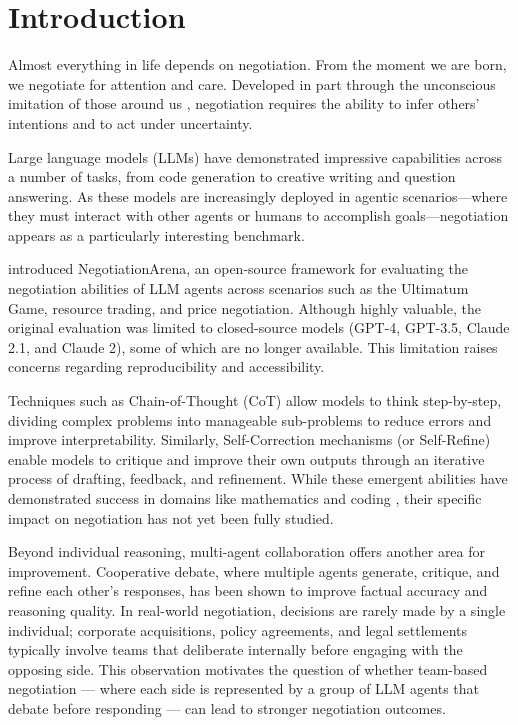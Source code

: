 \chapter{Introduction} \label{chap:intro}

Almost everything in life depends on negotiation. From the moment we are born, we negotiate for attention and care. Developed in part through the unconscious imitation of those around us \cite{Graham2014}, negotiation requires the ability to infer others’ intentions and to act under uncertainty.

Large language models (LLMs) have demonstrated impressive capabilities across a number of tasks, from code generation to creative writing and question answering. As these models are increasingly deployed in agentic scenarios—where they must interact with other agents or humans to accomplish goals—negotiation appears as a particularly interesting benchmark.

\textcite{bianchi_how_2024} introduced NegotiationArena, an open-source framework for evaluating the negotiation abilities of LLM agents across scenarios such as the Ultimatum Game, resource trading, and price negotiation. Although highly valuable, the original evaluation was limited to closed-source models (GPT-4, GPT-3.5, Claude 2.1, and Claude 2), some of which are no longer available. This limitation raises concerns regarding reproducibility and accessibility.

Techniques such as Chain-of-Thought (CoT) allow models to think step-by-step, dividing complex problems into manageable sub-problems to reduce errors and improve interpretability. Similarly, Self-Correction mechanisms (or Self-Refine) enable models to critique and improve their own outputs through an iterative process of drafting, feedback, and refinement. While these emergent abilities have demonstrated success in domains like mathematics and coding , their specific impact on negotiation has not yet been fully studied. 

Beyond individual reasoning, multi-agent collaboration offers another area for improvement. Cooperative debate, where multiple agents generate, critique, and refine each other's responses, has been shown to improve factual accuracy and reasoning quality. In real-world negotiation, decisions are rarely made by a single individual; corporate acquisitions, policy agreements, and legal settlements typically involve teams that deliberate internally before engaging with the opposing side. This observation motivates the question of whether team-based negotiation — where each side is represented by a group of LLM agents that debate before responding — can lead to stronger negotiation outcomes.

